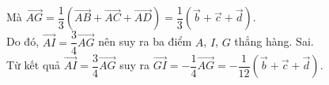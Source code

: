 \begin{ex}
{\begin{itemchoice}
		Mà $\overrightarrow{AG}=\dfrac{1}{3}(\overrightarrow{AB}+\overrightarrow{AC}+\overrightarrow{AD})=\dfrac{1}{3}(\overrightarrow{b}+\overrightarrow{c}+\overrightarrow{d})$.\\
		Do đó, $\overrightarrow{AI}=\dfrac{3}{4} \overrightarrow{AG}$ nên suy ra ba điểm $A$, $I$, $G$ thẳng hàng.
		\itemch Sai.\\
		Từ kết quả $\overrightarrow{AI}=\dfrac{3}{4} \overrightarrow{AG}$ suy ra $\overrightarrow{GI}=-\dfrac{1}{4} \overrightarrow{AG}=-\dfrac{1}{12}(\overrightarrow{b}+\overrightarrow{c}+\overrightarrow{d})$.
	\end{itemchoice}
	}
\end{ex}

